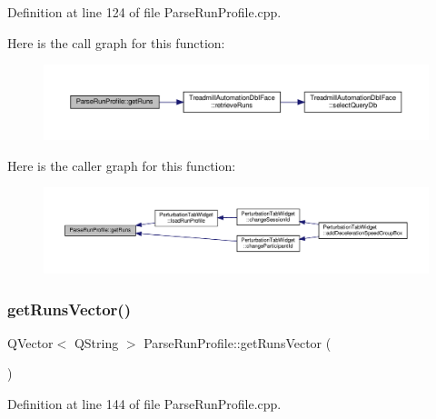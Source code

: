Definition at line 124 of file Parse\+Run\+Profile.\+cpp.

Here is the call graph for this function\+:
\nopagebreak
\begin{figure}[H]
\begin{center}
\leavevmode
\includegraphics[width=350pt]{class_parse_run_profile_a285a6e835fe873d2a88fa1415224c66a_cgraph}
\end{center}
\end{figure}
Here is the caller graph for this function\+:
\nopagebreak
\begin{figure}[H]
\begin{center}
\leavevmode
\includegraphics[width=350pt]{class_parse_run_profile_a285a6e835fe873d2a88fa1415224c66a_icgraph}
\end{center}
\end{figure}
\mbox{\label{class_parse_run_profile_aa55bcd03acbae8ae4dbb93125982f7fc}} 
\subsubsection{\texorpdfstring{get\+Runs\+Vector()}{getRunsVector()}}
{\footnotesize\ttfamily Q\+Vector$<$ Q\+String $>$ Parse\+Run\+Profile\+::get\+Runs\+Vector (\begin{DoxyParamCaption}{ }\end{DoxyParamCaption})}



Definition at line 144 of file Parse\+Run\+Profile.\+cpp.

